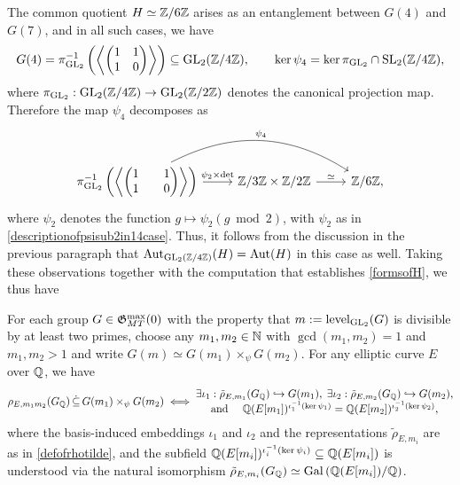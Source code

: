 The common quotient $H \simeq \mathbb{Z}/6\mathbb{Z}$ arises as an entanglement between $G(4)$ and $G(7)$, and in all such cases, we have
\[
G(4) = \pi_{\operatorname{GL}_2}^{-1}\left( \left\langle \begin{pmatrix} 1 & 1 \\ 1 & 0 \end{pmatrix} \right\rangle \right) \subseteq \operatorname{GL}_2(\mathbb{Z}/4\mathbb{Z}), \quad\quad \ker \psi_4 = \ker \pi_{\operatorname{GL}_2} \cap \operatorname{SL}_2(\mathbb{Z}/4\mathbb{Z}),
\]
where $\pi_{\operatorname{GL}_2} : \operatorname{GL}_2(\mathbb{Z}/4\mathbb{Z}) \to \operatorname{GL}_2(\mathbb{Z}/2\mathbb{Z})$ denotes the canonical projection map.  Therefore the map $\psi_4$ decomposes as
\[
\begin{tikzcd}
\pi_{\GL_2}^{-1}\left( \left\langle \begin{pmatrix} 1 & 1 \\ 1 & 0 \end{pmatrix} \right\rangle \right) \rar{\psi_2 \times \det} \arrow[black, bend left]{rr}{\psi_4} & \mbz/3\mbz \times \mbz/2\mbz \rar{\simeq} & \mbz/6\mbz,
\end{tikzcd}
\]
where $\psi_2$ denotes the function $g \mapsto \psi_2(g \bmod 2)$, with $\psi_2$ as in \eqref{descriptionofpsisub2in14case}.  Thus, it follows from the discussion in the previous paragraph that $\operatorname{Aut}_{\operatorname{GL}_2(\mathbb{Z}/4\mathbb{Z})}(H) = \operatorname{Aut}(H)$ in this case as well.  Taking these observations together with the computation that establishes \eqref{formsofH}, we thus have
\begin{cor} \label{keycorollaryforinterpretationofentanglements}
For each group $G \in \mathfrak{G}_{MT}^{\max}(0)$ with the property that $m := \operatorname{level}_{\operatorname{GL}_2}(G)$ is divisible by at least two primes, choose any $m_1, m_2 \in \mathbb{N}$ with $\gcd(m_1,m_2) = 1$ and $m_1, m_2 > 1$ and write $G(m) \simeq G(m_1) \times_{\psi} G(m_2)$.  For any elliptic curve $E$ over $\mathbb{Q}$, we have
\[
\rho_{E,m_1m_2}(G_{\mathbb{Q}}) \, \dot\subseteq \, G(m_1) \times_\psi G(m_2) \; \Longleftrightarrow \; \begin{matrix} \exists \iota_1 : \tilde{\rho}_{E,m_1}(G_{\mathbb{Q}}) \hookrightarrow G(m_1), \; \exists \iota_2 : \tilde{\rho}_{E,m_2}(G_{\mathbb{Q}}) \hookrightarrow G(m_2), \\ \text{and } \quad \mathbb{Q}(E[m_1])^{\iota_1^{-1}(\ker \psi_1)} = \mathbb{Q}(E[m_2])^{\iota_2^{-1}(\ker \psi_2)},
\end{matrix}
\]
where the basis-induced embeddings $\iota_1$ and $\iota_2$ and the representations $\tilde{\rho}_{E,m_i}$ are as in \eqref{defofrhotilde}, and the subfield $\mathbb{Q}(E[m_i])^{\iota_i^{-1}(\ker \psi_i)} \subseteq \mathbb{Q}(E[m_i])$ is understood via the natural isomorphism $\tilde{\rho}_{E,m_i}(G_{\mathbb{Q}}) \simeq \operatorname{Gal}\left( \mathbb{Q}(E[m_i])/\mathbb{Q} \right)$.
\end{cor}


